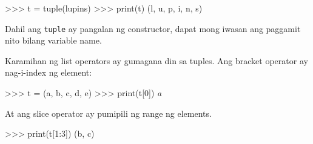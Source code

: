 \documentclass[10pt,]{book}
\newenvironment{Shaded}{}{}
\newcommand{\BuiltInTok}[1]{\textcolor[rgb]{0.00,0.50,0.00}{#1}}
\newcommand{\CommentTok}[1]{\textcolor[rgb]{0.38,0.63,0.69}{\textit{#1}}}
\newcommand{\DecValTok}[1]{\textcolor[rgb]{0.25,0.63,0.44}{#1}}
\newcommand{\NormalTok}[1]{#1}
\newcommand{\OperatorTok}[1]{\textcolor[rgb]{0.40,0.40,0.40}{#1}}
\newcommand{\StringTok}[1]{\textcolor[rgb]{0.25,0.44,0.63}{#1}}
\begin{document}
\begin{Shaded}
\begin{Highlighting}[]
\OperatorTok{\textgreater{}\textgreater{}\textgreater{}}\NormalTok{ t }\OperatorTok{=} \BuiltInTok{tuple}\NormalTok{(}\StringTok{\textquotesingle{}lupins\textquotesingle{}}\NormalTok{)}
\OperatorTok{\textgreater{}\textgreater{}\textgreater{}} \BuiltInTok{print}\NormalTok{(t)}
\NormalTok{(}\StringTok{\textquotesingle{}l\textquotesingle{}}\NormalTok{, }\StringTok{\textquotesingle{}u\textquotesingle{}}\NormalTok{, }\StringTok{\textquotesingle{}p\textquotesingle{}}\NormalTok{, }\StringTok{\textquotesingle{}i\textquotesingle{}}\NormalTok{, }\StringTok{\textquotesingle{}n\textquotesingle{}}\NormalTok{, }\StringTok{\textquotesingle{}s\textquotesingle{}}\NormalTok{)}
\end{Highlighting}
\end{Shaded}

Dahil ang \texttt{tuple} ay pangalan ng constructor, dapat mong iwasan
ang paggamit nito bilang variable name.

Karamihan ng list operators ay gumagana din sa tuples. Ang bracket
operator ay nag-i-index ng element:

 

\begin{Shaded}
\begin{Highlighting}[]
\OperatorTok{\textgreater{}\textgreater{}\textgreater{}}\NormalTok{ t }\OperatorTok{=}\NormalTok{ (}\StringTok{\textquotesingle{}a\textquotesingle{}}\NormalTok{, }\StringTok{\textquotesingle{}b\textquotesingle{}}\NormalTok{, }\StringTok{\textquotesingle{}c\textquotesingle{}}\NormalTok{, }\StringTok{\textquotesingle{}d\textquotesingle{}}\NormalTok{, }\StringTok{\textquotesingle{}e\textquotesingle{}}\NormalTok{)}
\OperatorTok{\textgreater{}\textgreater{}\textgreater{}} \BuiltInTok{print}\NormalTok{(t[}\DecValTok{0}\NormalTok{])}
\CommentTok{\textquotesingle{}a\textquotesingle{}}
\end{Highlighting}
\end{Shaded}

At ang slice operator ay pumipili ng range ng elements.

  

\begin{Shaded}
\begin{Highlighting}[]
\OperatorTok{\textgreater{}\textgreater{}\textgreater{}} \BuiltInTok{print}\NormalTok{(t[}\DecValTok{1}\NormalTok{:}\DecValTok{3}\NormalTok{])}
\NormalTok{(}\StringTok{\textquotesingle{}b\textquotesingle{}}\NormalTok{, }\StringTok{\textquotesingle{}c\textquotesingle{}}\NormalTok{)}
\end{Highlighting}
\end{Shaded}
\end{document}
